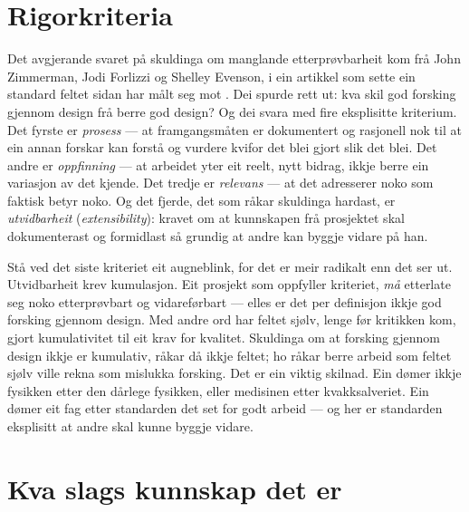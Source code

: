\section{Rigorkriteria}

Det avgjerande svaret på skuldinga om manglande etterprøvbarheit kom frå John Zimmerman, Jodi Forlizzi og Shelley Evenson, i ein artikkel som sette ein standard feltet sidan har målt seg mot \autocite{zimmerman2007rtd}. Dei spurde rett ut: kva skil god forsking gjennom design frå berre god design? Og dei svara med fire eksplisitte kriterium. Det fyrste er \emph{prosess} — at framgangsmåten er dokumentert og rasjonell nok til at ein annan forskar kan forstå og vurdere kvifor det blei gjort slik det blei. Det andre er \emph{oppfinning} — at arbeidet yter eit reelt, nytt bidrag, ikkje berre ein variasjon av det kjende. Det tredje er \emph{relevans} — at det adresserer noko som faktisk betyr noko. Og det fjerde, det som råkar skuldinga hardast, er \emph{utvidbarheit} (\textit{extensibility}): kravet om at kunnskapen frå prosjektet skal dokumenterast og formidlast så grundig at andre kan byggje vidare på han.

Stå ved det siste kriteriet eit augneblink, for det er meir radikalt enn det ser ut. Utvidbarheit krev kumulasjon. Eit prosjekt som oppfyller kriteriet, \emph{må} etterlate seg noko etterprøvbart og vidareførbart — elles er det per definisjon ikkje god forsking gjennom design. Med andre ord har feltet sjølv, lenge før kritikken kom, gjort kumulativitet til eit krav for kvalitet. Skuldinga om at forsking gjennom design ikkje er kumulativ, råkar då ikkje feltet; ho råkar berre arbeid som feltet sjølv ville rekna som mislukka forsking. Det er ein viktig skilnad. Ein dømer ikkje fysikken etter den dårlege fysikken, eller medisinen etter kvakksalveriet. Ein dømer eit fag etter standarden det set for godt arbeid — og her er standarden eksplisitt at andre skal kunne byggje vidare.

\section{Kva slags kunnskap det er}

